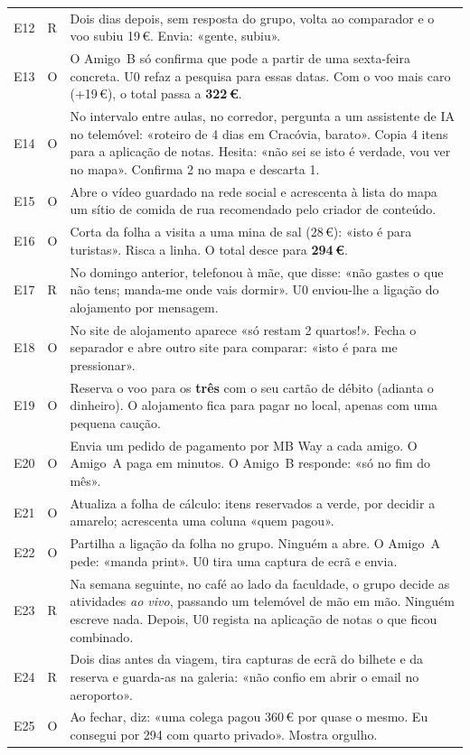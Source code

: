 \documentclass[11pt,a4paper]{article}
\begin{document}
{\begin{longtable}{@{}p{0.9cm}p{0.7cm}p{13.6cm}@{}}
E12 & R & Dois dias depois, sem resposta do grupo, volta ao comparador e o voo subiu 19\,€. Envia: «gente, subiu». \\
E13 & O & O Amigo~B só confirma que pode a partir de uma sexta-feira concreta. U0 refaz a pesquisa para essas datas. Com o voo mais caro (+19\,€), o total passa a \textbf{322\,€}. \\
E14 & O & No intervalo entre aulas, no corredor, pergunta a um assistente de IA no telemóvel: «roteiro de 4 dias em Cracóvia, barato». Copia 4 itens para a aplicação de notas. Hesita: «não sei se isto é verdade, vou ver no mapa». Confirma 2 no mapa e descarta 1. \\
E15 & O & Abre o vídeo guardado na rede social e acrescenta à lista do mapa um sítio de comida de rua recomendado pelo criador de conteúdo. \\
E16 & O & Corta da folha a visita a uma mina de sal (28\,€): «isto é para turistas». Risca a linha. O total desce para \textbf{294\,€}. \\
E17 & R & No domingo anterior, telefonou à mãe, que disse: «não gastes o que não tens; manda-me onde vais dormir». U0 enviou-lhe a ligação do alojamento por mensagem. \\
E18 & O & No site de alojamento aparece «só restam 2 quartos!». Fecha o separador e abre outro site para comparar: «isto é para me pressionar». \\
E19 & O & Reserva o voo para os \textbf{três} com o seu cartão de débito (adianta o dinheiro). O alojamento fica para pagar no local, apenas com uma pequena caução. \\
E20 & O & Envia um pedido de pagamento por MB Way a cada amigo. O Amigo~A paga em minutos. O Amigo~B responde: «só no fim do mês». \\
E21 & O & Atualiza a folha de cálculo: itens reservados a verde, por decidir a amarelo; acrescenta uma coluna «quem pagou». \\
E22 & O & Partilha a ligação da folha no grupo. Ninguém a abre. O Amigo~A pede: «manda print». U0 tira uma captura de ecrã e envia. \\
E23 & R & Na semana seguinte, no café ao lado da faculdade, o grupo decide as atividades \emph{ao vivo}, passando um telemóvel de mão em mão. Ninguém escreve nada. Depois, U0 regista na aplicação de notas o que ficou combinado. \\
E24 & R & Dois dias antes da viagem, tira capturas de ecrã do bilhete e da reserva e guarda-as na galeria: «não confio em abrir o email no aeroporto». \\
E25 & O & Ao fechar, diz: «uma colega pagou 360\,€ por quase o mesmo. Eu consegui por 294 com quarto privado». Mostra orgulho. \\
\bottomrule
\end{longtable}}
\end{document}
